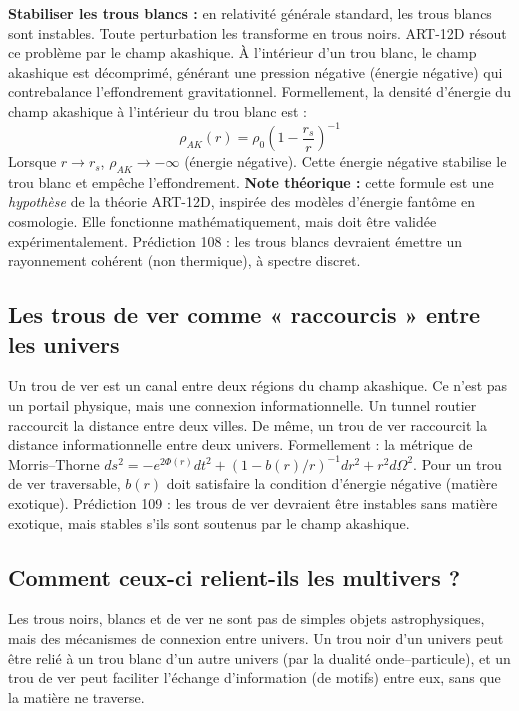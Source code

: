 \textbf{Stabiliser les trous blancs :} en relativité générale standard, les trous blancs sont instables. Toute perturbation les transforme en trous noirs. ART-12D résout ce problème par le champ akashique. À l'intérieur d'un trou blanc, le champ akashique est décomprimé, générant une pression négative (énergie négative) qui contrebalance l'effondrement gravitationnel. Formellement, la densité d'énergie du champ akashique à l'intérieur du trou blanc est :
\begin{equation}
\rho_{AK}(r) = \rho_0 \left(1 - \frac{r_s}{r}\right)^{-1}
\end{equation}
Lorsque $r \to r_s$, $\rho_{AK} \to -\infty$ (énergie négative). Cette énergie négative stabilise le trou blanc et empêche l'effondrement. \textbf{Note théorique :} cette formule est une \textit{hypothèse} de la théorie ART-12D, inspirée des modèles d'énergie fantôme en cosmologie. Elle fonctionne mathématiquement, mais doit être validée expérimentalement. Prédiction 108 : les trous blancs devraient émettre un rayonnement cohérent (non thermique), à spectre discret.

\subsection{Les trous de ver comme « raccourcis » entre les univers}
Un trou de ver est un canal entre deux régions du champ akashique. Ce n'est pas un portail physique, mais une connexion informationnelle. Un tunnel routier raccourcit la distance entre deux villes. De même, un trou de ver raccourcit la distance informationnelle entre deux univers. Formellement : la métrique de Morris--Thorne $ds^2 = -e^{2\Phi(r)}dt^2 + (1-b(r)/r)^{-1}dr^2 + r^2 d\Omega^2$. Pour un trou de ver traversable, $b(r)$ doit satisfaire la condition d'énergie négative (matière exotique). Prédiction 109 : les trous de ver devraient être instables sans matière exotique, mais stables s'ils sont soutenus par le champ akashique.

\subsection{Comment ceux-ci relient-ils les multivers ?}
Les trous noirs, blancs et de ver ne sont pas de simples objets astrophysiques, mais des mécanismes de connexion entre univers. Un trou noir d'un univers peut être relié à un trou blanc d'un autre univers (par la dualité onde--particule), et un trou de ver peut faciliter l'échange d'information (de motifs) entre eux, sans que la matière ne traverse.

